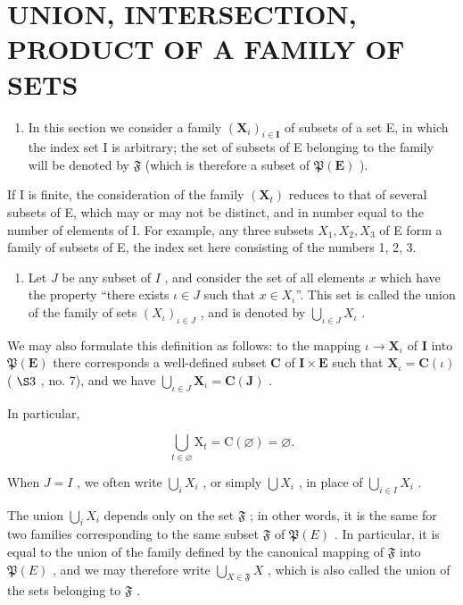 \section{UNION, INTERSECTION, PRODUCT OF A FAMILY OF SETS}

\begin{enumerate}
\def\labelenumi{\arabic{enumi}.}
\tightlist
\item
  In this section we consider a family \((\mathbf{X}_{i})_{i\in\mathbf{I}}\) of subsets of a set E, in which the index set I is arbitrary; the set of subsets of E belonging to the family will be denoted by \(\mathfrak{F}\) (which is therefore a subset of \(\mathfrak{P}(\mathbf{E})\) ).
\end{enumerate}

If I is finite, the consideration of the family \((\mathbf{X}_{t})\) reduces to that of several subsets of E, which may or may not be distinct, and in number equal to the number of elements of I. For example, any three subsets \(X_{1}, X_{2}, X_{3}\) of E form a family of subsets of E, the index set here consisting of the numbers 1, 2, 3.

\begin{enumerate}
\def\labelenumi{\arabic{enumi}.}
\setcounter{enumi}{1}
\tightlist
\item
  Let \(J\) be any subset of \(I\) , and consider the set of all elements \(x\) which have the property ``there exists \(\iota \in J\) such that \(x \in X_\iota\)''. This set is called the union of the family of sets \((X_\iota)_{\iota \in J}\) , and is denoted by \(\bigcup_{\iota\in J} X_\iota\) .
\end{enumerate}

We may also formulate this definition as follows: to the mapping \(\iota \to \mathbf{X}_{\iota}\) of \(\mathbf{I}\) into \(\mathfrak{P}(\mathbf{E})\) there corresponds a well-defined subset \(\mathbf{C}\) of \(\mathbf{I} \times \mathbf{E}\) such that \(\mathbf{X}_{\iota} = \mathbf{C}(\iota)\) ( \(\S 3\) , no. 7), and we have \(\bigcup_{\iota \in J} \mathbf{X}_{\iota} = \mathbf{C}(\mathbf{J})\) .

In particular,

\[
\bigcup_ {t \in \varnothing} \mathrm{X} _ {t} = \mathrm{C} (\varnothing) = \varnothing .\tag{33}
\]

When \(J = I\) , we often write \(\bigcup_{i} X_i\) , or simply \(\bigcup X_i\) , in place of \(\bigcup_{i \in I} X_i\) .

The union \(\bigcup_{i} X_{i}\) depends only on the set \(\mathfrak{F}\) ; in other words, it is the same for two families corresponding to the same subset \(\mathfrak{F}\) of \(\mathfrak{P}(E)\) . In particular, it is equal to the union of the family defined by the canonical mapping of \(\mathfrak{F}\) into \(\mathfrak{P}(E)\) , and we may therefore write \(\bigcup_{X \in \mathfrak{F}} X\) , which is also called the union of the sets belonging to \(\mathfrak{F}\) .

